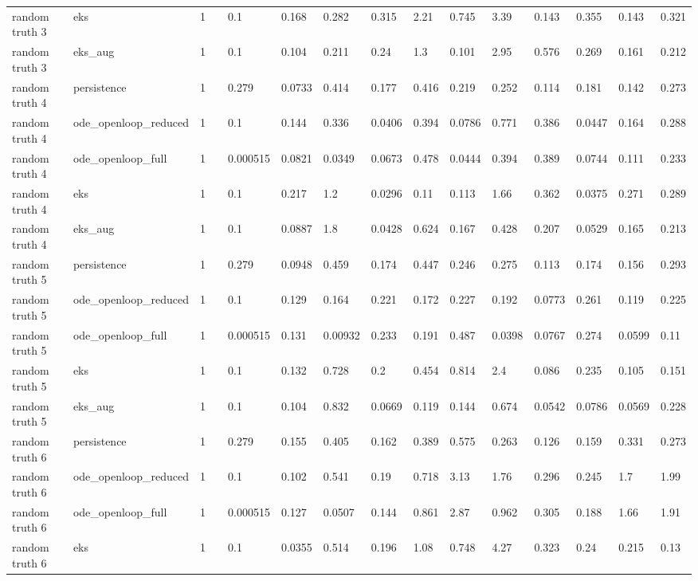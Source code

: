 \begin{table}[t]
\begin{tabular}{lllllllllllllll}
random truth 3 & eks & 1 &  & 0.1 & 0.168 & 0.282 & 0.315 & 2.21 & 0.745 & 3.39 & 0.143 & 0.355 & 0.143 & 0.321 \\
random truth 3 & eks\_aug & 1 &  & 0.1 & 0.104 & 0.211 & 0.24 & 1.3 & 0.101 & 2.95 & 0.576 & 0.269 & 0.161 & 0.212 \\
random truth 4 & persistence & 1 &  & 0.279 & 0.0733 & 0.414 & 0.177 & 0.416 & 0.219 & 0.252 & 0.114 & 0.181 & 0.142 & 0.273 \\
random truth 4 & ode\_openloop\_reduced & 1 &  & 0.1 & 0.144 & 0.336 & 0.0406 & 0.394 & 0.0786 & 0.771 & 0.386 & 0.0447 & 0.164 & 0.288 \\
random truth 4 & ode\_openloop\_full & 1 &  & 0.000515 & 0.0821 & 0.0349 & 0.0673 & 0.478 & 0.0444 & 0.394 & 0.389 & 0.0744 & 0.111 & 0.233 \\
random truth 4 & eks & 1 &  & 0.1 & 0.217 & 1.2 & 0.0296 & 0.11 & 0.113 & 1.66 & 0.362 & 0.0375 & 0.271 & 0.289 \\
random truth 4 & eks\_aug & 1 &  & 0.1 & 0.0887 & 1.8 & 0.0428 & 0.624 & 0.167 & 0.428 & 0.207 & 0.0529 & 0.165 & 0.213 \\
random truth 5 & persistence & 1 &  & 0.279 & 0.0948 & 0.459 & 0.174 & 0.447 & 0.246 & 0.275 & 0.113 & 0.174 & 0.156 & 0.293 \\
random truth 5 & ode\_openloop\_reduced & 1 &  & 0.1 & 0.129 & 0.164 & 0.221 & 0.172 & 0.227 & 0.192 & 0.0773 & 0.261 & 0.119 & 0.225 \\
random truth 5 & ode\_openloop\_full & 1 &  & 0.000515 & 0.131 & 0.00932 & 0.233 & 0.191 & 0.487 & 0.0398 & 0.0767 & 0.274 & 0.0599 & 0.11 \\
random truth 5 & eks & 1 &  & 0.1 & 0.132 & 0.728 & 0.2 & 0.454 & 0.814 & 2.4 & 0.086 & 0.235 & 0.105 & 0.151 \\
random truth 5 & eks\_aug & 1 &  & 0.1 & 0.104 & 0.832 & 0.0669 & 0.119 & 0.144 & 0.674 & 0.0542 & 0.0786 & 0.0569 & 0.228 \\
random truth 6 & persistence & 1 &  & 0.279 & 0.155 & 0.405 & 0.162 & 0.389 & 0.575 & 0.263 & 0.126 & 0.159 & 0.331 & 0.273 \\
random truth 6 & ode\_openloop\_reduced & 1 &  & 0.1 & 0.102 & 0.541 & 0.19 & 0.718 & 3.13 & 1.76 & 0.296 & 0.245 & 1.7 & 1.99 \\
random truth 6 & ode\_openloop\_full & 1 &  & 0.000515 & 0.127 & 0.0507 & 0.144 & 0.861 & 2.87 & 0.962 & 0.305 & 0.188 & 1.66 & 1.91 \\
random truth 6 & eks & 1 &  & 0.1 & 0.0355 & 0.514 & 0.196 & 1.08 & 0.748 & 4.27 & 0.323 & 0.24 & 0.215 & 0.13 \\

\end{tabular}
\end{table}

